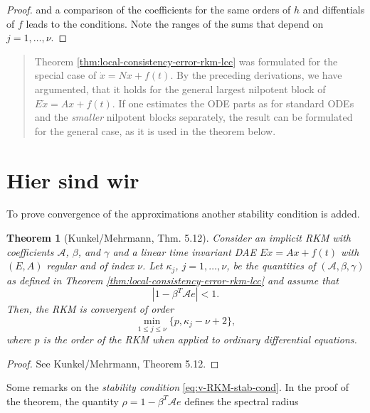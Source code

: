 \documentclass[]{book}
\newenvironment {JHSAYS} [0] {\begin{quote}\color{jhsc}} {\end{quote}}
\newtheorem{theorem}{Theorem}[chapter]
\theoremstyle{definition}
\theoremstyle{definition}
\theoremstyle{definition}
\theoremstyle{definition}
\theoremstyle{remark}
\begin{document}
\begin{proof}
and a comparison of the coefficients for the same orders of \(h\) and diffentials of \(f\) leads to the conditions. Note the ranges of the sums that depend on \(j=1, \dotsc, \nu\).
\end{proof}

\begin{JHSAYS}
Theorem \ref{thm:local-consistency-error-rkm-lcc} was formulated for the special case of \(\dot x = Nx +f(t)\). By the preceding derivations, we have argumented, that it holds for the general largest nilpotent block of \(E\dot x = Ax+f(t)\). If one estimates the ODE parts as for standard ODEs and the \emph{smaller} nilpotent blocks separately, the result can be formulated for the general case, as it is used in the theorem below.
\end{JHSAYS}

\hypertarget{hier-sind-wir}{%
\section{Hier sind wir}\label{hier-sind-wir}}

To prove convergence of the approximations another stability condition is added.

\begin{theorem}[Kunkel/Mehrmann, Thm. 5.12]
\protect\hypertarget{thm:v-convergence-RKM-LTI}{}{\label{thm:v-convergence-RKM-LTI} {} }Consider an implicit RKM with coefficients \(\mathcal A\), \(\beta\), and \(\gamma\) and a linear time invariant DAE \(E\dot x = Ax+f(t)\) with \((E,A)\) regular and of index \(\nu\). Let \(\kappa_j\), \(j=1,\dots,\nu\), be the quantities of \((\mathcal A,\beta, \gamma)\) as defined in Theorem \ref{thm:local-consistency-error-rkm-lcc} and assume that
\begin{equation}
| 1-\beta ^T\mathcal Ae| < 1. \label{eq:v-RKM-stab-cond}
\end{equation}
Then, the RKM is convergent of order
\begin{equation}
\min_{1\leq j \leq \nu}\{p, \kappa_j - \nu +2\},
\end{equation}
where \(p\) is the order of the RKM when applied to ordinary differential equations.
\end{theorem}

\begin{proof}
{}See Kunkel/Mehrmann, Theorem 5.12.
\end{proof}

Some remarks on the \emph{stability condition} \eqref{eq:v-RKM-stab-cond}. In the proof of the theorem, the quantity \(\rho = 1-\beta ^T\mathcal Ae\) defines the spectral radius
\end{document}
